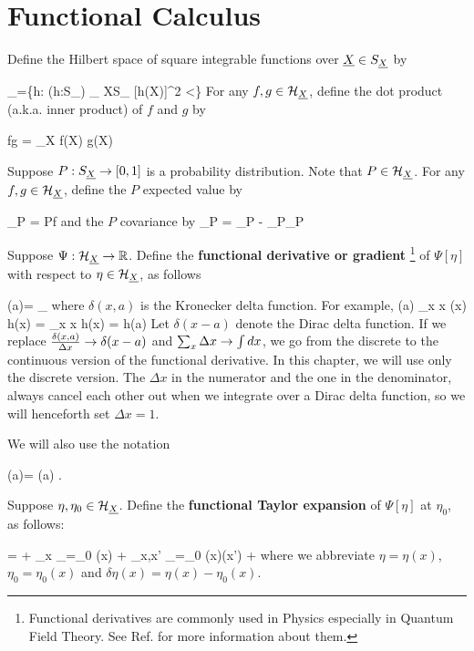 \section{Functional Calculus}

Define
the Hilbert space of square integrable functions over ${\underline{X}}\in S_{\underline{X}}$
by

\beq
\calh_\rvX =\{h: (h:S_\rvX\rarrow \RR) 
\sum_{ X\in S_ \rvX}[h(X)]^2 <\infty\}
\eeq
For any $f,g\in {\cal H}_{\underline{X}}$,
define the dot product (a.k.a. inner product)
of $f$ and $g$ by

\beq
f\cdot g = \sum_X f(X) g(X)
\eeq


Suppose $P:S_{\underline{X}}\rightarrow [0,1]$
is a probability distribution.
Note that $P\in{\cal H}_{\underline{X}}$.
For any $f,g\in{\cal H}_{\underline{X}}$,
define the $P$ expected value by

\beq
{}_P = P\cdot f
\eeq
and the $P$ covariance by
\beq
{}_P =
_P - _P_P
\eeq

Suppose $\Psi:{\cal H}_{\underline{X}}\rightarrow { \mathbb{R}}$.
Define the
{\bf functional derivative or gradient }\footnote{
Functional derivatives are commonly used in Physics
especially in Quantum Field Theory.
See Ref.\cite{wiki-func-deri} for more
information about them.}
of $\Psi[\eta]$ with respect to $\eta\in{\cal H}_{\underline{X}}$, as follows


\beq
\frac{\delta \Psi[\eta]}
{\delta \eta(a)}=
\lim_{\eps{}}
{\eps}
\eeq
where $\delta(x,a)$ is the Kronecker delta function.
For example,
\beq
\frac{\delta}
{\delta \eta(a)}
\sum_x \Delta x\; \eta(x) h(x)
=
\sum_x \Delta x  h(x)
=
h(a)
\eeq
 Let
$\delta(x-a)$ denote the Dirac delta function. If we replace
$\frac{\delta(x,a)}{\Delta x}\rightarrow\delta(x-a)$
and $\sum_x \Delta x\rightarrow \int dx$, we go
from the discrete to the continuous version
of the functional derivative.
In this chapter, we will use only the discrete version.
The $\Delta x$ in the numerator
and the one in the denominator, always cancel
each other out
when we integrate over a Dirac delta function, so we will
henceforth set
$\Delta x=1$.

We will also use the notation

\beq
\dpsi[\eta](a)=
\frac{\delta \Psi[\eta]}
{\delta \eta(a)}
\;.
\eeq

Suppose $\eta, \eta_0\in {\cal H}_{\underline{X}}$. Define the
{\bf functional Taylor expansion} of $\Psi[\eta]$
at $\eta_0$, as follows:

\beq
\Psi[\eta]=
\Psi[\eta_0]
+ \sum_x
_{\eta=\eta_0}
\delta\eta(x)
+
\sum_{x,x'}
_{\eta=\eta_0}
\delta\eta(x)\delta\eta(x')
+
\cdots
\eeq
where we abbreviate
$ \eta =\eta(x)$,
$\eta_0=\eta_0(x)$ and $\delta \eta(x) = \eta(x)-\eta_0(x)$.



